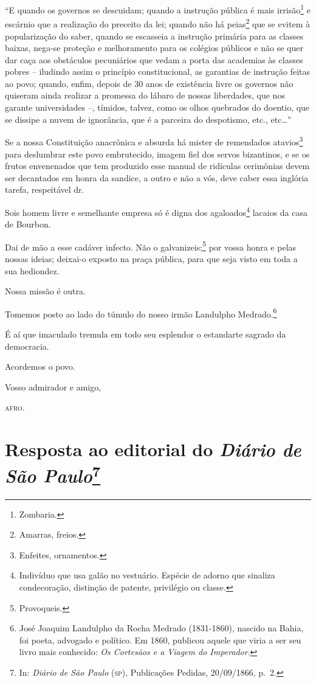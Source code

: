 ``E quando os governos se descuidam; quando a instrução pública é mais
irrisão\footnote{Zombaria.} e escárnio que a realização do preceito da
lei; quando não há peias\footnote{Amarras, freios.} que se evitem à
popularização do saber, quando se escasseia a instrução primária para as
classes baixas, nega-se proteção e melhoramento para os colégios
públicos e não se quer dar caça aos obstáculos pecuniários que vedam a
porta das academias às classes pobres -- iludindo assim o princípio
constitucional, as garantias de instrução feitas ao povo; quando, enfim,
depois de 30 anos de existência livre os governos não quiseram ainda
realizar a promessa do lábaro de nossas liberdades, que nos garante
universidades --, tímidos, talvez, como os olhos quebrados do doentio,
que se dissipe a nuvem de ignorância, que é a parceira do despotismo,
etc., etc\ldots''

Se a nossa Constituição anacrônica e absurda há mister de remendados
atavios\footnote{Enfeites, ornamentos.} para deslumbrar este povo
embrutecido, imagem fiel dos servos bizantinos, e se os frutos
envenenados que tem produzido esse manual de ridículas cerimônias devem
ser decantados em honra da sandice, a outro e não a vós, deve caber essa
inglória tarefa, respeitável dr.

Sois homem livre e semelhante empresa só é digna dos
agaloados\footnote{Indivíduo que usa galão no vestuário. Espécie de
  adorno que sinaliza condecoração, distinção de patente, privilégio ou
  classe.} lacaios da casa de Bourbon.

Dai de mão a esse cadáver infecto. Não o galvanizeis;\footnote{
  Provoqueis.} por vossa honra e pelas nossas ideias; deixai-o exposto
na praça pública, para que seja visto em toda a sua hediondez.

Nossa missão é outra.

Tomemos posto ao lado do túmulo do nosso irmão Landulpho
Medrado.\footnote{José Joaquim Landulpho da Rocha Medrado (1831-1860),
  nascido na Bahia, foi poeta, advogado e político. Em 1860, publicou
  aquele que viria a ser seu livro mais conhecido: \emph{Os Cortesãos e
  a Viagem do Imperador}.}

É aí que imaculado tremula em todo seu esplendor o estandarte sagrado da
democracia.

Acordemos o povo.

Vosso admirador e amigo,
\begin{flushright}
\textsc{afro.}
\end{flushright}
\chapter{Resposta ao editorial do \emph{Diário de São Paulo}\footnote{
  In: \emph{Diário de São Paulo} (\textsc{sp}), Publicações Pedidas, 20/09/1866,
  p.~2.}}

